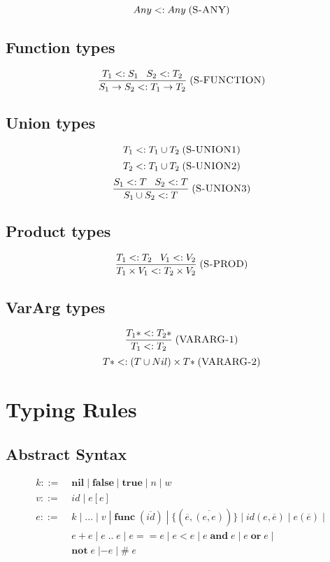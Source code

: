 \documentclass[12pt]{article}
\newcommand{\mylabel}[1]{\; (\textsc{#1})}
\newcommand{\subtype}{<:}
\newcommand{\pipe}{\;|\;}
\begin{document}
\[
Any \subtype Any
\mylabel{S-ANY}
\]

\subsection{Function types}

\[
\frac{T_{1} \subtype S_{1} \;\;\; S_{2} \subtype T_{2}}
     {S_{1} \rightarrow S_{2} \subtype T_{1} \rightarrow T_{2}}
\mylabel{S-FUNCTION}
\]

\subsection{Union types}

\[
T_{1} \subtype T_{1} \cup T_{2}
\mylabel{S-UNION1}
\]
\[
T_{2} \subtype T_{1} \cup T_{2}
\mylabel{S-UNION2}
\]
\[
\frac{S_{1} \subtype T \;\;\; S_{2} \subtype T}
     {S_{1} \cup S_{2} \subtype T}
\mylabel{S-UNION3}
\]

\subsection{Product types}

\[
\frac{T_{1} \subtype T_{2} \;\;\; V_{1} \subtype V_{2}}
     {T_{1} \times V_{1} \subtype T_{2} \times V_{2}}
\mylabel{S-PROD}
\]

\subsection{VarArg types}

\[
\frac{T_{1}* \subtype T_{2}*}
     {T_{1} \subtype T_{2}}
\mylabel{VARARG-1}
\]
\[
{T*} \subtype (T \cup Nil) \times {T*}
\mylabel{VARARG-2}
\]

\section{Typing Rules}

\subsection{Abstract Syntax}

\begin{align*}
k ::= \; & \mathbf{nil} \pipe \mathbf{false} \pipe \mathbf{true}
\pipe n \pipe w\\ 
v ::= \; & id \pipe e[e]\\
e ::= \; & k \pipe {...} \pipe v \pipe \mathbf{func} \; (\overline{id})
\pipe \{(\overline{e},\overline{(e,e)})\}
\pipe id(e,\overline{e}) \pipe e(\overline{e}) \pipe\\
& e + e \pipe e \; {..} \; e \pipe e == e \pipe e < e
\pipe e \; \mathbf{and} \; e \pipe e \; \mathbf{or} \; e \pipe\\
& \mathbf{not} \; e \; | - e \pipe \# \; e
\end{align*}
\end{document}
